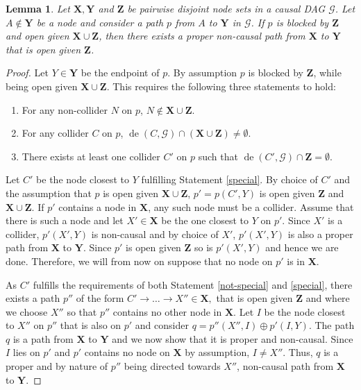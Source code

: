 \documentclass[11pt,a4paper]{article}
\newtheorem{Lemma}[Satz]{Lemma}
\theoremstyle{definition}
\theoremstyle{remark}
\DeclareMathOperator{\de}{de}
\newcommand{\g}[1][G]{\mathcal{#1}}
\begin{document}
\begin{Lemma}
	Let $\mathbf{X},\mathbf{Y}$ and $\mathbf{Z}$ be pairwise disjoint node sets in a causal DAG $\g$. Let $A \notin \mathbf{Y}$ be a node and consider a path $p$ from $A$ to $\mathbf{Y}$ in $\g$. If  $p$ is blocked by $\mathbf{Z}$ and open given $\mathbf{X} \cup \mathbf{Z}$, then there exists a proper non-causal path from $\mathbf{X}$ to $\mathbf{Y}$ that is open given $\mathbf{Z}$. 
	\label{lemma:collider}
\end{Lemma}


\begin{proof}
	Let $Y \in \mathbf{Y}$ be the endpoint of $p$.
	By assumption $p$ is blocked by $\mathbf{Z}$, while being open given $\mathbf{X} \cup \mathbf{Z}$. This requires the following three statements to hold:
	\begin{enumerate}
		\item For any non-collider $N$ on $p$, $N \notin \mathbf{X} \cup \mathbf{Z}$.
		\item For any collider $C$ on $p$, $\de(C,\g) \cap (\mathbf{X} \cup \mathbf{Z}) \neq \emptyset$.
		\label{not-special}
		\item There exists at least one collider $C'$ on $p$ such that $\de(C',\g) \cap \mathbf{Z} = \emptyset$.
		\label{special}
	\end{enumerate}
	Let $C'$ be the node closest to $Y$ fulfilling Statement \eqref{special}. By choice of $C'$ and the assumption that $p$ is open given $\mathbf{X} \cup \mathbf{Z}$, $p'=p(C',Y)$ is open given $\mathbf{Z}$ and $\mathbf{X} \cup \mathbf{Z}$. If $p'$ contains a node in $\mathbf{X}$, any such node must be a collider. Assume that there is such a node and let $X' \in \mathbf{X}$ be the one closest to $Y$ on $p'$. Since $X'$ is a collider, $p'(X',Y)$ is non-causal and by choice of $X'$, $p'(X',Y)$ is also a proper path from $\mathbf{X}$ to $\mathbf{Y}$. Since $p'$ is open given $\mathbf{Z}$ so is $p'(X',Y)$ and hence we are done. Therefore, we will from now on suppose that no node on $p'$ is in $\mathbf{X}$. 
	
	As $C'$ fulfills the requirements of both Statement \eqref{not-special} and \eqref{special}, there exists a path $p''$ of the form 
	$
	C' \rightarrow \dots \rightarrow X'' \in \mathbf{X},
	$
	that is open given $\mathbf{Z}$ and where we choose $X''$ so that $p''$ contains no other node in $\mathbf{X}$.
	Let $I$ be the node closest to $X''$ on $p''$ that is also on $p'$ and consider $q = p''(X'',I) \oplus p'(I,Y)$.  The path $q$ is a path from $\mathbf{X}$ to $\mathbf{Y}$ and we now show that it is proper and non-causal. Since $I$ lies on $p'$ and $p'$ contains no node on $\mathbf{X}$ by assumption, $I \neq X''$. Thus, $q$ is a proper and by nature of $p''$ being directed towards $X''$, non-causal path from $\mathbf{X}$ to $\mathbf{Y}$.
	

\end{proof}
\end{document}
